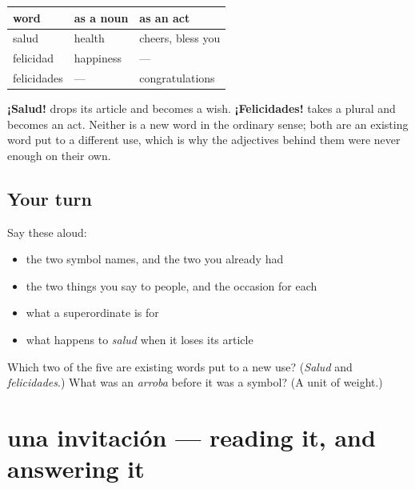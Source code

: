 \begin{grammarlens}[title={Grammar Lens: two of them are nouns doing other work}]
\noindent
\begin{tabularx}{\linewidth}{@{}>{\raggedright\arraybackslash}X>{\raggedright\arraybackslash}X>{\raggedright\arraybackslash}X@{}}
\toprule
\textbf{word} & \textbf{as a noun} & \textbf{as an act} \\
\midrule
salud & health & cheers, bless you \\
felicidad & happiness & — \\
felicidades & — & congratulations \\
\bottomrule
\end{tabularx}

\textbf{¡Salud!} drops its article and becomes a wish. \textbf{¡Felicidades!} takes a plural and becomes an act. Neither is a new word in the ordinary sense; both are an existing word put to a different use, which is why the adjectives behind them were never enough on their own.
\end{grammarlens}

\subsection*{Your turn}
Say these aloud:

\begin{itemize}
\raggedright
  \item the two symbol names, and the two you already had
  \item the two things you say to people, and the occasion for each
  \item what a superordinate is for
  \item what happens to \emph{salud} when it loses its article
\end{itemize}

\begin{tcolorbox}[breakable,colback=teal!4,colframe=teal!35!black,title={Before you move on}]
Which two of the five are existing words put to a new use? (\emph{Salud} and \emph{felicidades}.) What was an \emph{arroba} before it was a symbol? (A unit of weight.)
\end{tcolorbox}
\section[una invitación]{una invitación — reading it, and answering it}

\label{lesson:ES-C428-sintesis-cumpleanos}



